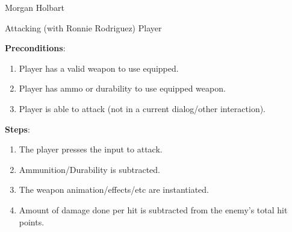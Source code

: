 \documentclass[12pt]{report}
\begin{document}
\begin{section}{Morgan Holbart}
\begin{subsection}{Attacking (with Ronnie Rodriguez)}
Player

\textbf{Preconditions}:

\begin{enumerate}
\item Player has a valid weapon to use equipped.
\item Player has ammo or durability to use equipped weapon.
\item Player is able to attack (not in a current dialog/other interaction).
\end{enumerate}

\textbf{Steps}:

\begin{enumerate}
\item The player presses the input to attack.
\item Ammunition/Durability is subtracted.
\item The weapon animation/effects/etc are instantiated.
\item Amount of damage done per hit is subtracted from the enemy's total hit
points.
\end{enumerate}
\end{subsection}
\end{section}
\end{document}
